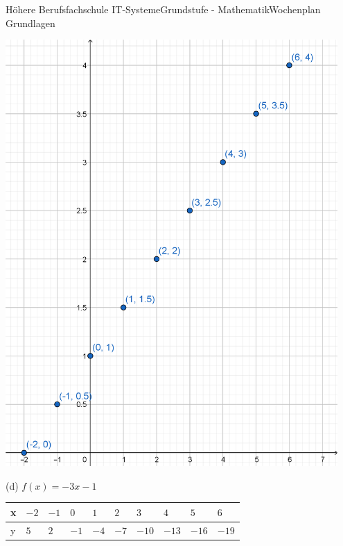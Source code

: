 \documentclass[oneside,openany,headings=optiontotoc,11pt,numbers=noenddot]{scrreprt}
\begin{document}
\begin{worksheet}{Höhere Berufsfachschule IT-Systeme}{Grundstufe - Mathematik}{Wochenplan Grundlagen}
\begin{framed}
			\includegraphics[width=0.95\textwidth]{../99_Bilder/WP3Doc.png}\\
			\par\bigskip\noindent
			(d) \(f(x) = -3x-1\)\\
			\begin{tabularx}{\textwidth}{l|M|M|M|M|M|M|M|M|M}
				x & \(-2\) & \(-1\) & \(0\) & \(1\) & \(2\) & \(3\) & \(4\) & \(5\) & \(6\)\\
				\hline
				y & \(5\) & \(2\) & \(-1\) & \(-4\) & \(-7\) & \(-10\) & \(-13\) & \(-16\) & \(-19\)\\ 
			\end{tabularx}\\
			\par\noindent

\end{framed}
\end{worksheet}
\end{document}
